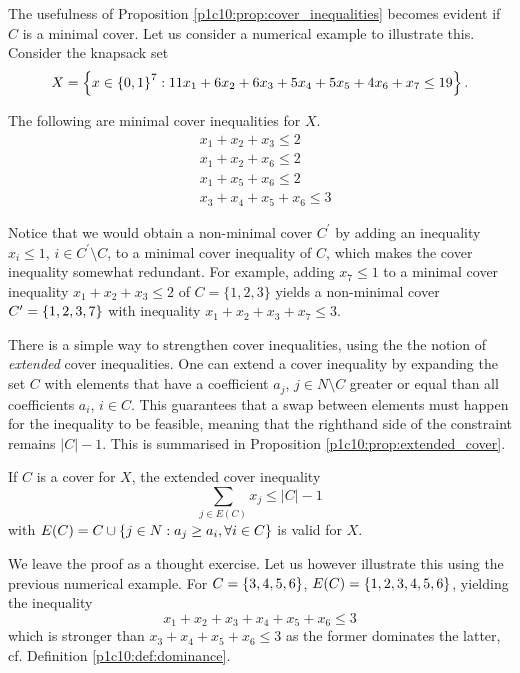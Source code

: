 The usefulness of Proposition \ref{p1c10:prop:cover_inequalities} becomes evident if $C$ is a minimal cover. Let us consider a numerical example to illustrate this. Consider the knapsack set 
%
\begin{equation*}
	X = \left\{ x \in \left\{ 0,1 \right \}^7 : 11x_1 + 6x_2 + 6x_3 + 5x_4 + 5x_5 + 4x_6 + x_7 \leq 19 \right \}.	
\end{equation*}

The following are minimal cover inequalities for $X$. 
%
\begin{align*}
&x_1 + x_2 + x_3 \leq 2\\
&x_1 + x_2 +x_6 \leq 2\\
&x_1 + x_5 + x_6 \leq 2\\
&x_3 + x_4 + x_5 + x_6 \leq 3
\end{align*}

Notice that we would obtain a non-minimal cover $C^\prime$ by adding an inequality $x_i \leq 1$, $i \in C^\prime\setminus C$, to a minimal cover inequality of $C$, which makes the cover inequality somewhat redundant. For example, adding $x_7 \leq 1$ to a minimal cover inequality $x_1 + x_2 + x_3 \leq 2$ of $C = \{1,2,3\}$ yields a non-minimal cover $C^\prime = \left\{ 1,2,3,7 \right \}$ with inequality $x_1 + x_2 + x_3 + x_7 \leq 3$.

There is a simple way to strengthen cover inequalities, using the the notion of \emph{extended} cover inequalities. One can extend a cover inequality by expanding the set $C$ with elements that have a coefficient $a_j$, $j \in N \setminus C$ greater or equal than all coefficients $a_i$, $i \in C$. This guarantees that a swap between elements must happen for the inequality to be feasible, meaning that the righthand side of the constraint remains $|C| - 1$. This is summarised in Proposition \ref{p1c10:prop:extended_cover}.

\begin{proposition} \label{p1c10:prop:extended_cover}
	If $C$ is a cover for $X$, the extended cover inequality
	\begin{equation*}
		\sum_{j \in E(C)} x_j \leq |C|-1
	\end{equation*}
	with $E(C) = C \cup \left\{ j\in N: a_j \geq a_i, \forall i \in C \right \}$ is valid for $X$.
\end{proposition}

We leave the proof as a thought exercise. Let us however illustrate this using the previous numerical example. For $C = \left\{ 3,4,5,6 \right \}$, $E(C) = \left\{ 1,2,3,4,5,6 \right \}$, yielding the inequality 
%
\begin{equation*}
	x_1 + x_2 + x_3 + x_4 + x_5 + x_6 \leq 3	
\end{equation*}
%
which is stronger than $x_3 + x_4 + x_5 + x_6 \leq 3$ as the former dominates the latter, cf. Definition \ref{p1c10:def:dominance}. 


